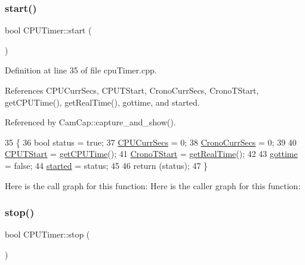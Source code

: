 \subsubsection{\texorpdfstring{start()}{start()}}
{\footnotesize\ttfamily bool C\+P\+U\+Timer\+::start (\begin{DoxyParamCaption}{ }\end{DoxyParamCaption})}



Definition at line 35 of file cpu\+Timer.\+cpp.



References C\+P\+U\+Curr\+Secs, C\+P\+U\+T\+Start, Crono\+Curr\+Secs, Crono\+T\+Start, get\+C\+P\+U\+Time(), get\+Real\+Time(), gottime, and started.



Referenced by Cam\+Cap\+::capture\+\_\+and\+\_\+show().


\begin{DoxyCode}
35                      \{
36     \textcolor{keywordtype}{bool} status = \textcolor{keyword}{true};
37     \hyperlink{class_c_p_u_timer_aa34930f260364d48351fac6f5b926c82}{CPUCurrSecs} = 0;
38     \hyperlink{class_c_p_u_timer_a5cd38d0e4893710f1c85f1aa03961cbc}{CronoCurrSecs} = 0;
39 
40     \hyperlink{class_c_p_u_timer_a0248a7ebc1ed9fb9bcd4f63f07f9f984}{CPUTStart} = \hyperlink{class_c_p_u_timer_a3403f8cce7b7518e47a1826b8650220c}{getCPUTime}();
41     \hyperlink{class_c_p_u_timer_a097a928f647be3a1e679d702a74119ed}{CronoTStart} = \hyperlink{class_c_p_u_timer_a57da0f833904f3ddf20a640e0f8fe127}{getRealTime}();
42 
43     \hyperlink{class_c_p_u_timer_ab0f086c04c1b6019db26c44db9812d80}{gottime} = \textcolor{keyword}{false};
44     \hyperlink{class_c_p_u_timer_a8fde2f68dd2f4811400429dcf9a4a6c7}{started} = status;
45 
46     \textcolor{keywordflow}{return} (status);
47 \}
\end{DoxyCode}
Here is the call graph for this function\+:
Here is the caller graph for this function\+:
\mbox{\label{class_c_p_u_timer_afc986e87c38afb37b7911f8424726d1d}} 
\subsubsection{\texorpdfstring{stop()}{stop()}}
{\footnotesize\ttfamily bool C\+P\+U\+Timer\+::stop (\begin{DoxyParamCaption}{ }\end{DoxyParamCaption})}



